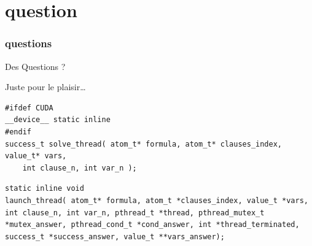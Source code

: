 \documentclass{beamer}
\begin{document}
\section*{question}

\begin{frame}
\frametitle{questions}

\begin{center}
Des Questions ?
\end{center}
\null
\end{frame}

Juste pour le plaisir\ldots{}  \\

\begin{lstlisting}
#ifdef CUDA
__device__ static inline
#endif
success_t solve_thread( atom_t* formula, atom_t* clauses_index, value_t* vars, 
    int clause_n, int var_n );
\end{lstlisting}

\begin{lstlisting}
static inline void 
launch_thread( atom_t* formula, atom_t *clauses_index, value_t *vars, int clause_n, int var_n, pthread_t *thread, pthread_mutex_t *mutex_answer, pthread_cond_t *cond_answer, int *thread_terminated, success_t *success_answer, value_t **vars_answer);
\end{lstlisting}

\end{document}
